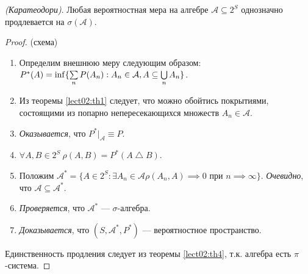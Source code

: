         \begin{theorem}\label{lect02:th5}
            \emph{(Каратеодори)}. Любая вероятностная мера на алгебре $\mathcal{A} \subseteq 2^S$ однозначно продлевается на $\sigma (\mathcal{A})$.
        \end{theorem}
        \begin{proof}
            (схема)
            \begin{enumerate}
                \item Определим внешнюю меру следующим образом: $P^* (A) = \inf \{ \sum\limits_n \P(A_n): A_n \in \mathcal{A}, A \subseteq \bigcup\limits_n A_n \}$. 
                \item Из теоремы \ref{lect02:th1} следует, что можно обойтись покрытиями, состоящими из попарно непересекающихся множеств $A_n \in \mathcal{A}$.
                \item \emph{Оказывается}, что $P^*|_{\mathcal{A}} \equiv P$.
                \item $\forall A, B \in 2^S \ \rho (A, B) = P^*(A \bigtriangleup B)$.
                \item Положим $\mathcal{A}^* = \{ A \in 2^S: \exists A_n \in \mathcal{A} \rho (A_n, A) \implies 0 \text{ при } n \implies \infty \}$. \emph{Очевидно}, что $\mathcal{A} \subseteq \mathcal{A}^*$. 
                \item \emph{Проверяется}, что $\mathcal{A}^*$ --- $\sigma$-алгебра.
                \item \emph{Доказывается}, что $(S, \mathcal{A}^*, P^*)$ --- вероятностное пространство.
            \end{enumerate}
            Единственность продления следует из теоремы \ref{lect02:th4}, т.к. алгебра есть $\pi$-система.
        \end{proof}